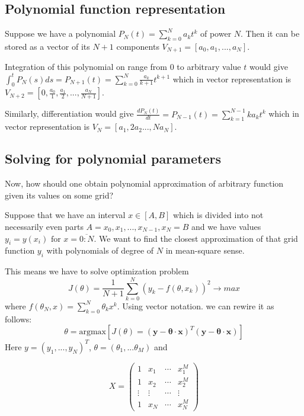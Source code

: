 \documentclass[11pt]{article} %
\begin{document}
\subsection{Polynomial function representation}
Suppose we have a polynomial $P_N(t) = \sum_{k=0}^N a_k t^k$ of power $N$. Then it can be stored as a vector of its $N+1$ components $V_{N+1} = [a_0, a_1, ..., a_N]$.

Integration of this polynomial on range from $0$ to arbitrary value $t$ would give $\int_0^t{P_N(s)ds} = P_{N+1}(t) = \sum_{k=0}^{N} \frac{a_k}{k+1} t^{k+1}$
which in vector representation is $V_{N+2} = \left[0, \frac{a_0}{1}, \frac{a_1}{2}, ..., \frac{a_N}{N+1}\right]$. 

Similarly, differentiation would give $\frac{dP_N(t)}{dt} = P_{N-1}(t) = \sum_{k=1}^{N-1} ka_k t^k$ which in vector representation is $V_{N} = \left[a_1, 2a_2 ..., Na_N\right]$.

\subsection{Solving for polynomial parameters}
Now, how should one obtain polynomial approximation of arbitrary function given its values on some grid? 

Suppose that we have an interval $x \in [A,B]$ which is divided into not necessarily even parts $A = x_0, x_1, ..., x_{N-1}, x_N = B$ and we have values $y_i = y(x_i) \text{ for } x = \overline{0:N}$. We want to find the closest approximation of that grid function $y_i$ with polynomials of degree of $N$ in mean-square sense. 

This means we have to solve optimization problem 
\begin{equation}
J(\theta) = \frac{1}{N+1}\sum_{k=0}^{N}\left(y_k-f(\theta,x_k)\right)^2 \to max
\end{equation} where $f(\theta_N,x) =  \sum_{k=0}^N \theta_k x^k$.
Using vector notation. we can rewire it as follows:
\begin{equation}
\theta = \text{argmax}\left[J(\theta) = \left(\mathbf{y}-\mathbf{\theta \cdot x}\right)^T\left(\mathbf{y}-\mathbf{\theta \cdot x}\right)\right]
\end{equation} 
Here $y = (y_1, ..., y_N)^T$, $\theta = (\theta_1,...\theta_M)$ and 

\begin{equation}
X = 
\begin{pmatrix}
1 & x_1 & \cdots & x_1^M \\
1 & x_2 & \cdots & x_2^M \\
\vdots & \vdots & \cdots & \vdots \\
1 & x_N & \cdots & x_N^M 
\end{pmatrix}
\nonumber
\end{equation} 
\end{document}
